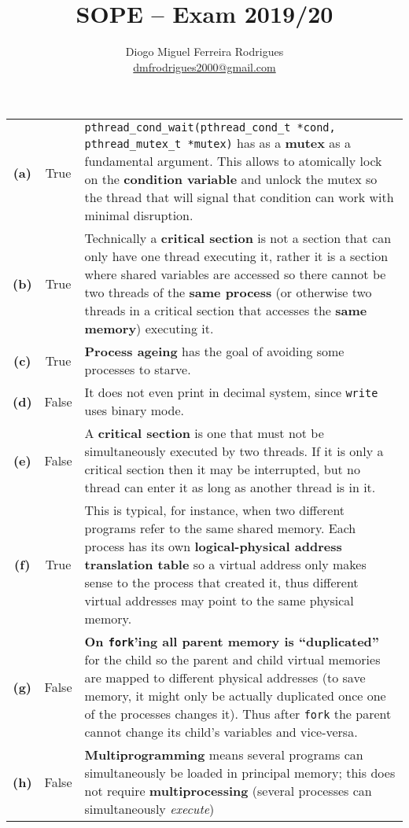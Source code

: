 \documentclass{sope}
\title{SOPE -- Exam 2019/20}
\author{Diogo Miguel Ferreira Rodrigues \\ \href{mailto:dmfrodrigues2000@gmail.com}{dmfrodrigues2000@gmail.com}}
\begin{document}
\setcounter{chapter}{19}
\begin{center}    
    \begin{longtable}{c | c p{132mm}}
        \textbf{(a)} & True & \texttt{pthread\_cond\_wait(pthread\_cond\_t *cond, pthread\_mutex\_t *mutex)} has as a \textbf{mutex} as a fundamental argument. This allows to atomically lock on the \textbf{condition variable} and unlock the mutex so the thread that will signal that condition can work with minimal disruption. \\
        \textbf{(b)} & True & Technically a \textbf{critical section} is not a section that can only have one thread executing it, rather it is a section where shared variables are accessed so there cannot be two threads of the \textbf{same process} (or otherwise two threads in a critical section that accesses the \textbf{same memory}) executing it. \\
        \textbf{(c)} & True & \textbf{Process ageing} has the goal of avoiding some processes to starve. \\
        \textbf{(d)} & False & It does not even print in decimal system, since \texttt{write} uses binary mode. \\
        \textbf{(e)} & False & A \textbf{critical section} is one that must not be simultaneously executed by two threads. If it is only a critical section then it may be interrupted, but no thread can enter it as long as another thread is in it. \\
        \textbf{(f)} & True & This is typical, for instance, when two different programs refer to the same shared memory. Each process has its own \textbf{logical-physical address translation table} so a virtual address only makes sense to the process that created it, thus different virtual addresses may point to the same physical memory. \\
        \textbf{(g)} & False & \textbf{On \texttt{fork}'ing all parent memory is ``duplicated''} for the child so the parent and child virtual memories are mapped to different physical addresses (to save memory, it might only be actually duplicated once one of the processes changes it). Thus after \texttt{fork} the parent cannot change its child's variables and vice-versa. \\
        \textbf{(h)} & False & \textbf{Multiprogramming} means several programs can simultaneously be loaded in principal memory; this does not require \textbf{multiprocessing} (several processes can simultaneously \textit{execute})\\

\end{longtable}
\end{center}
\end{document}
